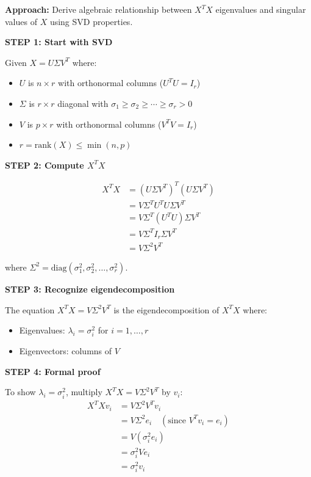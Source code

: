 \documentclass[12pt]{article}
\begin{document}
\begin{solution}

\textbf{Approach:} Derive algebraic relationship between $X^T X$ eigenvalues and singular values of $X$ using SVD properties.

\textbf{STEP 1: Start with SVD}

Given $X = U\Sigma V^T$ where:
\begin{itemize}
    \item $U$ is $n \times r$ with orthonormal columns ($U^T U = I_r$)
    \item $\Sigma$ is $r \times r$ diagonal with $\sigma_1 \geq \sigma_2 \geq \cdots \geq \sigma_r > 0$
    \item $V$ is $p \times r$ with orthonormal columns ($V^T V = I_r$)
    \item $r = \text{rank}(X) \leq \min(n, p)$
\end{itemize}

\textbf{STEP 2: Compute $X^T X$}

\begin{align*}
X^T X &= (U\Sigma V^T)^T (U\Sigma V^T) \\
&= V\Sigma^T U^T U \Sigma V^T \\
&= V\Sigma^T (U^T U) \Sigma V^T \\
&= V\Sigma^T I_r \Sigma V^T \\
&= V\Sigma^2 V^T
\end{align*}

where $\Sigma^2 = \text{diag}(\sigma_1^2, \sigma_2^2, \ldots, \sigma_r^2)$.

\textbf{STEP 3: Recognize eigendecomposition}

The equation $X^T X = V\Sigma^2 V^T$ is the eigendecomposition of $X^T X$ where:
\begin{itemize}
    \item Eigenvalues: $\lambda_i = \sigma_i^2$ for $i = 1, \ldots, r$
    \item Eigenvectors: columns of $V$
\end{itemize}

\textbf{STEP 4: Formal proof}

To show $\lambda_i = \sigma_i^2$, multiply $X^T X = V\Sigma^2 V^T$ by $v_i$:
\begin{align*}
X^T X v_i &= V\Sigma^2 V^T v_i \\
&= V\Sigma^2 e_i \quad (\text{since } V^T v_i = e_i) \\
&= V (\sigma_i^2 e_i) \\
&= \sigma_i^2 V e_i \\
&= \sigma_i^2 v_i
\end{align*}


\end{solution}
\end{document}
